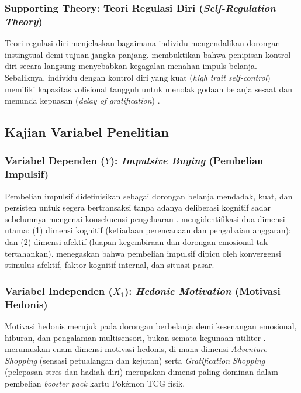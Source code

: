 \documentclass[12pt,a4paper]{article}
\numberwithin{equation}{section}
\numberwithin{table}{section}
\numberwithin{figure}{section}
\begin{document}
\subsubsection{Supporting Theory: Teori Regulasi Diri (\emph{Self-Regulation Theory})}

Teori regulasi diri \citep{baumeister2002yield} menjelaskan bagaimana individu mengendalikan dorongan instingtual demi tujuan jangka panjang. \citet{vohs2007spent} membuktikan bahwa penipisan kontrol diri secara langsung menyebabkan kegagalan menahan impuls belanja. Sebaliknya, individu dengan kontrol diri yang kuat (\emph{high trait self-control}) memiliki kapasitas volisional tangguh untuk menolak godaan belanja sesaat dan menunda kepuasan (\emph{delay of gratification}) \citep{tangney2004high}.

\subsection{Kajian Variabel Penelitian}

\subsubsection{Variabel Dependen ($Y$): \emph{Impulsive Buying} (Pembelian Impulsif)}

Pembelian impulsif didefinisikan sebagai dorongan belanja mendadak, kuat, dan persisten untuk segera bertransaksi tanpa adanya deliberasi kognitif sadar sebelumnya mengenai konsekuensi pengeluaran \citep{stern1962significance, rook1987buying, rook1995normative}. \citet{verplanken2001individual} mengidentifikasi dua dimensi utama: (1) dimensi kognitif (ketiadaan perencanaan dan pengabaian anggaran); dan (2) dimensi afektif (luapan kegembiraan dan dorongan emosional tak tertahankan). \citet{amos2014meta} menegaskan bahwa pembelian impulsif dipicu oleh konvergensi stimulus afektif, faktor kognitif internal, dan situasi pasar.

\subsubsection{Variabel Independen ($X_1$): \emph{Hedonic Motivation} (Motivasi Hedonis)}

Motivasi hedonis merujuk pada dorongan berbelanja demi kesenangan emosional, hiburan, dan pengalaman multisensori, bukan semata kegunaan utiliter \citep{hirschman1982hedonic, babin1994work}. \citet{arnold2003hedonic} merumuskan enam dimensi motivasi hedonis, di mana dimensi \emph{Adventure Shopping} (sensasi petualangan dan kejutan) serta \emph{Gratification Shopping} (pelepasan stres dan hadiah diri) merupakan dimensi paling dominan dalam pembelian \emph{booster pack} kartu Pok\'emon TCG fisik.
\end{document}
